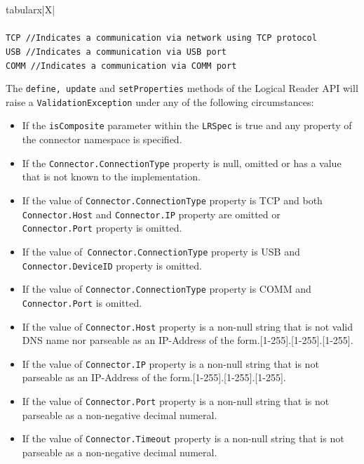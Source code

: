 \documentclass[11pt,a4paper,oneside]{article}
\newenvironment{bbox}%
{\begin{table}[h!]\begin{threeparttable}}%
{\end{threeparttable}\end{table}\FloatBarrier}
\newenvironment{bbox}
{\ifvmode\IgnorePar\fi \EndP\Tg<div class='bbox'>}{\Tg</div>\IgnoreIndent}
\begin{document}
\begin{bbox}
\begin{edtable}{tabularx}{\linewidth}{|X|}
\hline 
{}
\\
\\
\texttt{TCP   //Indicates a communication via network using TCP protocol}\\
\texttt{USB   //Indicates a communication via USB port}\\
\texttt{COMM //Indicates a communication via COMM port}\\
\hline
\end{edtable}
\end{bbox}

The \texttt{define, update} and \texttt{setProperties} methods of the Logical Reader API will raise a \texttt{ValidationException} under any of the following circumstances:

\begin{itemize}
\item 	If the \texttt{isComposite} parameter within the \texttt{LRSpec} is true and any property of the connector namespace is specified.
\item 	If the \texttt{Connector.ConnectionType} property is null, omitted or has a value that is not known to the implementation.
\item	If the value of \texttt{Connector.ConnectionType} property is TCP and both
\texttt{Connector.Host} and \texttt{Connector.IP} property are omitted or\ifpdf\\ \fi
\texttt{Connector.Port} property is omitted. 
\item	If the value of\texttt{ Connector.ConnectionType} property is USB and \ifpdf\\\fi
\texttt{Connector.DeviceID} property is omitted.
\item If the value of \texttt{Connector.ConnectionType} property is COMM and \ifpdf\\\fi
\texttt{Connector.Port} is omitted.
\item If the value of \texttt{Connector.Host} property is a non-null string that is not valid DNS name nor parseable as an IP-Address of the form\newline [1-255].[1-255].[1-255].[1-255].
\item If the value of \texttt{Connector.IP} property is a non-null string that is not parseable as an IP-Address of the form\newline [1-255].[1-255].[1-255].[1-255].
\item If the value of \texttt{Connector.Port} property is a non-null string that is not parseable as a non-negative decimal numeral.
\item If the value of \texttt{Connector.Timeout} property is a non-null string that is not parseable as a non-negative decimal numeral.
\end{itemize}
\end{document}
